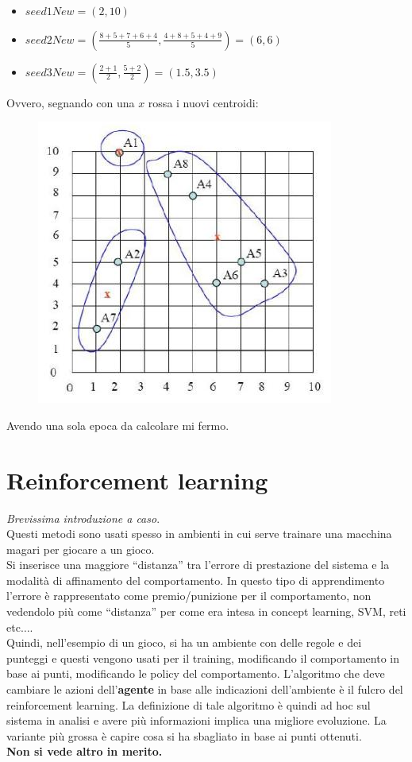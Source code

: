 \begin{esercizio}
\begin{itemize}
    \item $seed1New=(2, 10)$
    \item $seed2New=\left(\frac{8+5+7+6+4}{5},\frac{4+8+5+4+9}{5}\right)=(6, 6)$
    \item $seed3New=\left(\frac{2+1}{2},\frac{5+2}{2}\right)=(1.5, 3.5)$
  \end{itemize}
  Ovvero, segnando con una $x$ rossa i nuovi centroidi:
  \begin{figure}[H]
    \centering
    \includegraphics[scale = 0.4]{img/clue3.jpg}
  \end{figure}
  Avendo una sola epoca da calcolare mi fermo.
\end{esercizio}
\chapter{Reinforcement learning}
\textit{Brevissima introduzione a caso}.\\
Questi metodi sono usati spesso in ambienti in cui serve trainare una macchina
magari per giocare a un gioco.\\
Si inserisce una maggiore ``distanza'' tra l'errore di prestazione del sistema e
la modalità di affinamento del comportamento. In questo tipo di apprendimento
l'errore è rappresentato come premio/punizione per il comportamento, non
vedendolo più come ``distanza'' per come era intesa in concept learning, SVM,
reti etc$\ldots$.\\
Quindi, nell'esempio di un gioco, si ha un ambiente con delle regole e dei
punteggi e questi vengono usati per il training, modificando il comportamento in
base ai punti, modificando le policy del comportamento. L'algoritmo che deve
cambiare le azioni dell'\textbf{agente} in base alle indicazioni dell'ambiente è
il fulcro del reinforcement learning. La definizione di tale algoritmo è quindi
ad hoc sul sistema in analisi e avere più informazioni implica una migliore
evoluzione. La variante più grossa è capire cosa si ha sbagliato in base ai
punti ottenuti.  \\
\textbf{Non si vede altro in merito.}
